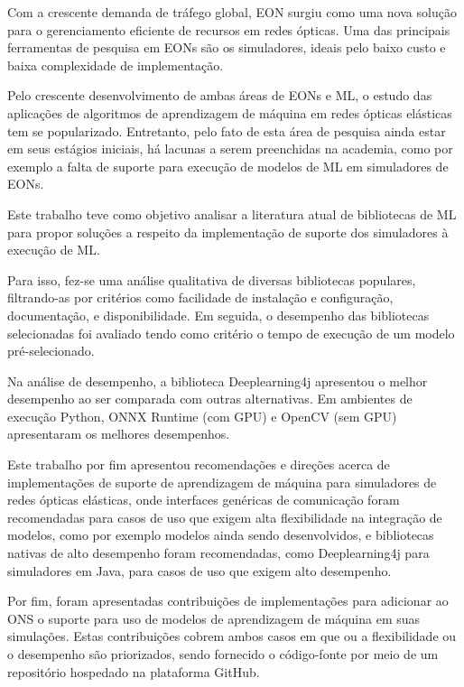 Com a crescente demanda de tráfego global, \acrfull{EON} surgiu como uma nova solução para o gerenciamento eficiente de recursos em redes ópticas. Uma das principais ferramentas de pesquisa em EONs são os simuladores, ideais pelo baixo custo e baixa complexidade de implementação.

Pelo crescente desenvolvimento de ambas áreas de \acrfull{EONs} e \acrfull{ML}, o estudo das aplicações de algoritmos de aprendizagem de máquina em redes ópticas elásticas tem se popularizado. Entretanto, pelo fato de esta área de pesquisa ainda estar em seus estágios iniciais, há lacunas a serem preenchidas na academia, como por exemplo a falta de suporte para execução de modelos de ML em simuladores de EONs.

Este trabalho teve como objetivo analisar a literatura atual de bibliotecas de ML para propor soluções a respeito da implementação de suporte dos simuladores à execução de ML.

Para isso, fez-se uma análise qualitativa de diversas bibliotecas populares, filtrando-as por critérios como facilidade de instalação e configuração, documentação, e disponibilidade. Em seguida, o desempenho das bibliotecas selecionadas foi avaliado tendo como critério o tempo de execução de um modelo pré-selecionado.

Na análise de desempenho, a biblioteca Deeplearning4j apresentou o melhor desempenho ao ser comparada com outras alternativas. Em ambientes de execução Python, ONNX Runtime (com GPU) e OpenCV (sem GPU) apresentaram os melhores desempenhos.

Este trabalho por fim apresentou recomendações e direções acerca de implementações de suporte de aprendizagem de máquina para simuladores de redes ópticas elásticas, onde interfaces genéricas de comunicação foram recomendadas para casos de uso que exigem alta flexibilidade na integração de modelos, como por exemplo modelos ainda sendo desenvolvidos, e bibliotecas nativas de alto desempenho foram recomendadas, como Deeplearning4j para simuladores em Java, para casos de uso que exigem alto desempenho.

Por fim, foram apresentadas contribuições de implementações para adicionar ao \acrfull{ONS} o suporte para uso de modelos de aprendizagem de máquina em suas simulações. Estas contribuições cobrem ambos casos em que ou a flexibilidade ou o desempenho são priorizados, sendo fornecido o código-fonte por meio de um repositório hospedado na plataforma GitHub.
